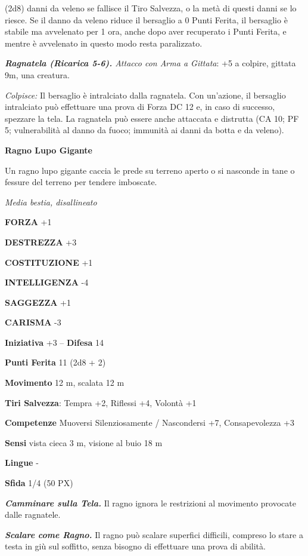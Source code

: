 \begin{multicols}{2}
(2d8) danni da veleno se fallisce il Tiro Salvezza, o la metà di questi danni se lo riesce. Se il danno da veleno riduce il bersaglio a 0 Punti Ferita, il bersaglio è stabile ma avvelenato per 1 ora, anche dopo aver recuperato i Punti Ferita, e mentre è avvelenato in questo modo resta paralizzato.

\textit{\textbf{Ragnatela (Ricarica 5-6).} Attacco con Arma a Gittata}: +5 a colpire, gittata 9m, una creatura.

\textit{Colpisce:} Il bersaglio è intralciato dalla ragnatela. Con un'azione, il bersaglio intralciato può effettuare una prova di Forza DC 12 e, in caso di successo, spezzare la tela. La ragnatela può essere anche attaccata e distrutta (CA 10; PF 5; vulnerabilità al danno da fuoco; immunità ai danni da botta e da veleno).

\medskip\textbf{Ragno Lupo Gigante}

Un ragno lupo gigante caccia le prede su terreno aperto o si nasconde in tane o fessure del terreno per tendere imboscate.

\textit{Media bestia, disallineato}

\textbf{FORZA} +1

\textbf{DESTREZZA} +3

\textbf{COSTITUZIONE} +1

\textbf{INTELLIGENZA} -4

\textbf{SAGGEZZA} +1

\textbf{CARISMA} -3

\textbf{Iniziativa} +3 -- \textbf{Difesa} 14

\textbf{Punti Ferita} 11 (2d8 + 2)

\textbf{Movimento} 12 m, scalata 12 m

\textbf{Tiri Salvezza}: Tempra +2, Riflessi +4, Volontà +1

\textbf{Competenze} Muoversi Silenziosamente / Nascondersi +7, Consapevolezza +3

\textbf{Sensi} vista cieca 3 m, visione al buio 18 m

\textbf{Lingue} -

\textbf{Sfida} 1/4 (50 PX)

\textit{\textbf{Camminare sulla Tela.}} Il ragno ignora le restrizioni al movimento provocate dalle ragnatele.

\textit{\textbf{Scalare come Ragno.}} Il ragno può scalare superfici difficili, compreso lo stare a testa in giù sul soffitto, senza bisogno di effettuare una prova di abilità.


\end{multicols}
